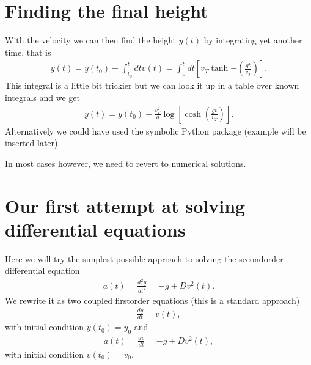 \documentclass[letterpaper,10pt,english]{sphinxmanual}
\begin{document}
\section{Finding the final height}
\label{\detokenize{chapter1:finding-the-final-height}}
With the velocity we can then find the height \(y(t)\) by integrating yet another time, that is
\begin{equation*}
\begin{split}
y(t)=y(t_0)+\int_{t_0}^t dt v(t)=\int_{0}^t dt[v_T\tanh{-(\frac{gt}{v_T})}].
\end{split}
\end{equation*}
This integral is a little bit trickier but we can look it up in a table over
known integrals and we get
\begin{equation*}
\begin{split}
y(t)=y(t_0)-\frac{v_T^2}{g}\log{[\cosh{(\frac{gt}{v_T})}]}.
\end{split}
\end{equation*}
Alternatively we could have used the symbolic Python package   (example will be inserted later).

In most cases however, we need to revert to numerical solutions.


\section{Our first attempt at solving differential equations}
\label{\detokenize{chapter1:our-first-attempt-at-solving-differential-equations}}
Here we will try the simplest possible approach to solving the second\sphinxhyphen{}order differential
equation
\begin{equation*}
\begin{split}
a(t) =\frac{d^2y}{dt^2}= -g +Dv^2(t).
\end{split}
\end{equation*}
We rewrite it as two coupled first\sphinxhyphen{}order equations (this is a standard approach)
\begin{equation*}
\begin{split}
\frac{dy}{dt} = v(t),
\end{split}
\end{equation*}
with initial condition \(y(t_0)=y_0\) and
\begin{equation*}
\begin{split}
a(t) =\frac{dv}{dt}= -g +Dv^2(t),
\end{split}
\end{equation*}
with initial condition \(v(t_0)=v_0\).
\end{document}
